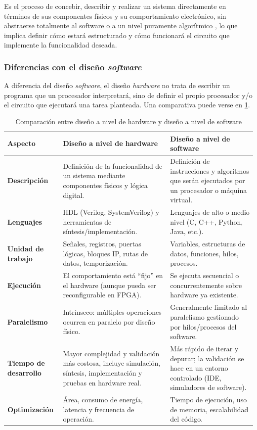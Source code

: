 Es el proceso de concebir, describir y realizar un sistema directamente en términos de sus componentes físicos y su comportamiento electrónico, sin abstraerse totalmente al software o a un nivel puramente algorítmico \cite{disenoHW}, lo que implica definir cómo estará estructurado y cómo funcionará el circuito que implemente la funcionalidad deseada.

\subsubsection{Diferencias con el diseño \textit{software}}

A diferencia del diseño \textit{software}, el diseño \textit{hardware} no trata de escribir un programa que un procesador interpretará, sino de definir el propio procesador y/o el circuito que ejecutará una tarea planteada. Una comparativa puede verse en \ref{tbl:compHWSW}.

\begin{table}[H]
\centering
\caption{Comparación entre diseño a nivel de hardware y diseño a nivel de software}
\begin{tabular}{|p{4cm}|p{5.5cm}|p{5.5cm}|}
\hline
\textbf{Aspecto} & \textbf{Diseño a nivel de hardware} & \textbf{Diseño a nivel de software} \\ \hline
\textbf{Descripción} & Definición de la funcionalidad de un sistema mediante componentes físicos y lógica digital. & Definición de instrucciones y algoritmos que serán ejecutados por un procesador o máquina virtual. \\ \hline
\textbf{Lenguajes} & HDL (Verilog, SystemVerilog) y herramientas de síntesis/implementación. & Lenguajes de alto o medio nivel (C, C++, Python, Java, etc.). \\ \hline
\textbf{Unidad de trabajo} & Señales, registros, puertas lógicas, bloques IP, rutas de datos, temporización. & Variables, estructuras de datos, funciones, hilos, procesos. \\ \hline
\textbf{Ejecución} & El comportamiento está “fijo” en el hardware (aunque pueda ser reconfigurable en FPGA). & Se ejecuta secuencial o concurrentemente sobre hardware ya existente. \\ \hline
\textbf{Paralelismo} & Intrínseco: múltiples operaciones ocurren en paralelo por diseño físico. & Generalmente limitado al paralelismo gestionado por hilos/procesos del software. \\ \hline
\textbf{Tiempo de desarrollo} & Mayor complejidad y validación más costosa, incluye simulación, síntesis, implementación y pruebas en hardware real. & Más rápido de iterar y depurar; la validación se hace en un entorno controlado (IDE, simuladores de software). \\ \hline
\textbf{Optimización} & Área, consumo de energía, latencia y frecuencia de operación. & Tiempo de ejecución, uso de memoria, escalabilidad del código. \\ \hline
\end{tabular}
\label{tbl:compHWSW}
\end{table}


